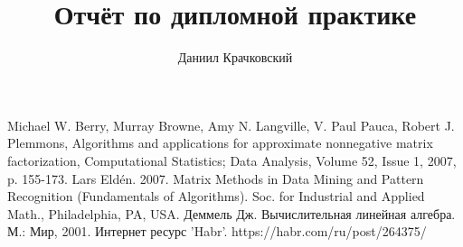 \documentclass[14pt]{extarticle}
\author{Даниил Крачковский}
\title{Отчёт по дипломной практике}
\begin{document}


\tableofcontents{}







\begin{thebibliography}{9}
	 Michael W. Berry, Murray Browne, Amy N. Langville, V. Paul Pauca, Robert J. Plemmons, Algorithms and applications for approximate nonnegative matrix factorization, Computational Statistics; Data Analysis, Volume 52, Issue 1, 2007, p. 155-173.
	 Lars Eldén. 2007. Matrix Methods in Data Mining and Pattern Recognition (Fundamentals of Algorithms). Soc. for Industrial and Applied Math., Philadelphia, PA, USA.
	 Деммель Дж. Вычислительная линейная алгебра. М.: Мир, 2001.
	 Интернет ресурс 'Habr'. https://habr.com/ru/post/264375/
\end{thebibliography}
\end{document}
